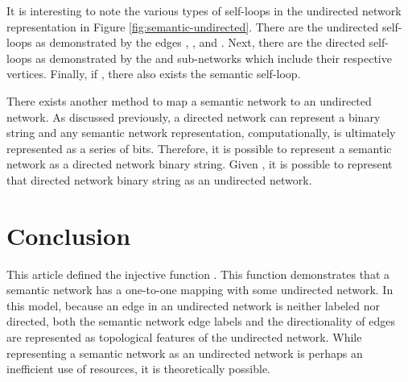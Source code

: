 \documentclass[twocolumn,preprintnumbers,amsmath,amssymb,letter]{revtex4}
\begin{document}
It is interesting to note the various types of self-loops in the undirected network representation in Figure \ref{fig:semantic-undirected}. There are the undirected self-loops as demonstrated by the edges , , and . Next, there are the directed self-loops as demonstrated by the  and  sub-networks which include their respective  vertices. Finally, if , there also exists the semantic self-loop.

There exists another method to map a semantic network to an undirected network. As discussed previously,  a directed network can represent a binary string and any semantic network representation, computationally, is ultimately represented as a series of bits. Therefore, it is possible to represent a semantic network as a directed network binary string. Given , it is possible to represent that directed network binary string as an undirected network.

\section{Conclusion}

This article defined the injective function . This function demonstrates that a semantic network has a one-to-one mapping with some undirected network. In this model, because an edge in an undirected network is neither labeled nor directed, both the semantic network edge labels and the directionality of edges are represented as topological features of the undirected network. While representing a semantic network as an undirected network is perhaps an inefficient use of resources, it is theoretically possible.
\end{document}
